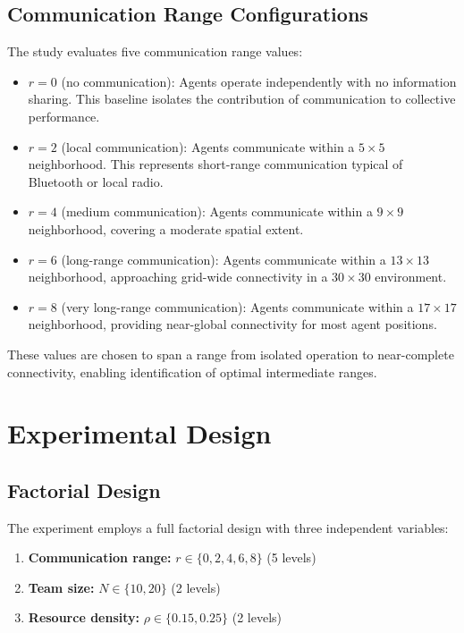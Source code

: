 \subsection{Communication Range Configurations}

The study evaluates five communication range values:

\begin{itemize}
    \item $r = 0$ (no communication): Agents operate independently with no information sharing. This baseline isolates the contribution of communication to collective performance.

    \item $r = 2$ (local communication): Agents communicate within a $5 \times 5$ neighborhood. This represents short-range communication typical of Bluetooth or local radio.

    \item $r = 4$ (medium communication): Agents communicate within a $9 \times 9$ neighborhood, covering a moderate spatial extent.

    \item $r = 6$ (long-range communication): Agents communicate within a $13 \times 13$ neighborhood, approaching grid-wide connectivity in a $30 \times 30$ environment.

    \item $r = 8$ (very long-range communication): Agents communicate within a $17 \times 17$ neighborhood, providing near-global connectivity for most agent positions.
\end{itemize}

These values are chosen to span a range from isolated operation to near-complete connectivity, enabling identification of optimal intermediate ranges.

\section{Experimental Design}

\subsection{Factorial Design}

The experiment employs a full factorial design with three independent variables:

\begin{enumerate}
    \item \textbf{Communication range:} $r \in \{0, 2, 4, 6, 8\}$ (5 levels)
    \item \textbf{Team size:} $N \in \{10, 20\}$ (2 levels)
    \item \textbf{Resource density:} $\rho \in \{0.15, 0.25\}$ (2 levels)
\end{enumerate}

